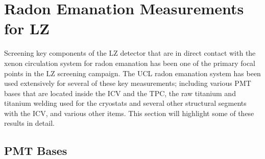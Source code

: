 \section{Radon Emanation Measurements for LZ}
\label{sec:uclradon}

Screening key components of the LZ detector that are in direct contact with the xenon circulation system for radon emanation has been one of the primary focal points in the LZ screening campaign. The UCL radon emanation system has been used extensively for several of these key measurements; including various PMT bases that are located inside the ICV and the TPC, the raw titanium and titanium welding used for the cryostats and several other structural segments with the ICV, and various other items. This section will highlight some of these results in detail.


\subsection{PMT Bases}
\label{secsec:pmt_base_emanation}

